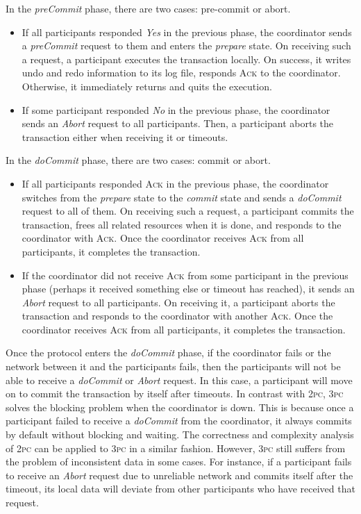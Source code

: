 \documentclass[11pt]{article}
\begin{document}
    In the \textit{preCommit} phase, there are two cases: pre-commit or abort.
    \begin{itemize}
      \item If all participants responded \textit{Yes} in the previous phase, the coordinator sends a \textit{preCommit} request to them and enters the \textit{prepare} state. On receiving such a request, a participant executes the transaction locally. On success, it writes undo and redo information to its log file, responds \textsc{Ack} to the coordinator. Otherwise, it immediately returns and quits the execution.
      \item If some participant responded \textit{No} in the previous phase, the coordinator sends an \textit{Abort} request to all participants. Then, a participant aborts the transaction either when receiving it or timeouts.
    \end{itemize}

    In the \textit{doCommit} phase, there are two cases: commit or abort.
    \begin{itemize}
      \item If all participants responded \textsc{Ack} in the previous phase, the coordinator switches from the \textit{prepare} state to the \textit{commit} state and sends a \textit{doCommit} request to all of them. On receiving such a request, a participant commits the transaction, frees all related resources when it is done, and responds to the coordinator with \textsc{Ack}. Once the coordinator receives \textsc{Ack} from all participants, it completes the transaction.
      \item If the coordinator did not receive \textsc{Ack} from some participant in the previous phase (perhaps it received something else or timeout has reached), it sends an \textit{Abort} request to all participants. On receiving it, a participant aborts the transaction and responds to the coordinator with another \textsc{Ack}. Once the coordinator receives \textsc{Ack} from all participants, it completes the transaction.
    \end{itemize}

    Once the protocol enters the \textit{doCommit} phase, if the coordinator fails or the network between it and the participants fails, then the participants will not be able to receive a \textit{doCommit} or \textit{Abort} request. In this case, a participant will move on to commit the transaction by itself after timeouts. In contrast with \textsc{2pc}, \textsc{3pc} solves the blocking problem when the coordinator is down. This is because once a participant failed to receive a \textit{doCommit} from the coordinator, it always commits by default without blocking and waiting. The correctness and complexity analysis of \textsc{2pc} can be applied to \textsc{3pc} in a similar fashion. However, \textsc{3pc} still suffers from the problem of inconsistent data in some cases. For instance, if a participant fails to receive an \textit{Abort} request due to unreliable network and commits itself after the timeout, its local data will deviate from other participants who have received that request.
\end{document}
